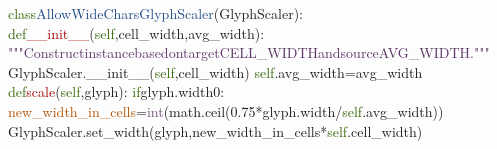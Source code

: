 \ESHBol{}\textcolor[HTML]{346604}{class}\ESHSpace{}\textcolor[HTML]{204A87}{AllowWideCharsGlyphScaler}(GlyphScaler):\ESHEol
\ESHBol{}\ESHSpace{}\ESHSpace{}\ESHSpace{}\ESHSpace{}\textcolor[HTML]{346604}{def}\ESHSpace{}\textcolor[HTML]{A40000}{\_\_init\_\_}(\textcolor[HTML]{346604}{self},\ESHSpace{}cell\_width,\ESHSpace{}avg\_width):\ESHEol
\ESHBol{}\ESHSpace{}\ESHSpace{}\ESHSpace{}\ESHSpace{}\ESHSpace{}\ESHSpace{}\ESHSpace{}\ESHSpace{}\textcolor[HTML]{5C3566}{"""Construct\ESHSpace{}instance\ESHSpace{}based\ESHSpace{}on\ESHSpace{}target\ESHSpace{}CELL\_WIDTH\ESHSpace{}and\ESHSpace{}source\ESHSpace{}AVG\_WIDTH."""}\ESHEol
\ESHBol{}\ESHSpace{}\ESHSpace{}\ESHSpace{}\ESHSpace{}\ESHSpace{}\ESHSpace{}\ESHSpace{}\ESHSpace{}GlyphScaler.\_\_init\_\_(\textcolor[HTML]{346604}{self},\ESHSpace{}cell\_width)\ESHEol
\ESHBol{}\ESHSpace{}\ESHSpace{}\ESHSpace{}\ESHSpace{}\ESHSpace{}\ESHSpace{}\ESHSpace{}\ESHSpace{}\textcolor[HTML]{346604}{self}.avg\_width\ESHSpace{}=\ESHSpace{}avg\_width\ESHEol
\ESHBol{}\mbox{}\ESHEol
\ESHBol{}\ESHSpace{}\ESHSpace{}\ESHSpace{}\ESHSpace{}\textcolor[HTML]{346604}{def}\ESHSpace{}\textcolor[HTML]{A40000}{scale}(\textcolor[HTML]{346604}{self},\ESHSpace{}glyph):\ESHEol
\ESHBol{}\ESHSpace{}\ESHSpace{}\ESHSpace{}\ESHSpace{}\ESHSpace{}\ESHSpace{}\ESHSpace{}\ESHSpace{}\textcolor[HTML]{346604}{if}\ESHSpace{}glyph.width\ESHSpace{}{>}\ESHSpace{}0:\ESHEol
\ESHBol{}\ESHSpace{}\ESHSpace{}\ESHSpace{}\ESHSpace{}\ESHSpace{}\ESHSpace{}\ESHSpace{}\ESHSpace{}\ESHSpace{}\ESHSpace{}\ESHSpace{}\ESHSpace{}\textcolor[HTML]{B35000}{new\_width\_in\_cells}\ESHSpace{}=\ESHSpace{}\textcolor[HTML]{75507B}{int}(math.ceil(0.75\ESHSpace{}*\ESHSpace{}glyph.width\ESHSpace{}/\ESHSpace{}\textcolor[HTML]{346604}{self}.avg\_width))\ESHEol
\ESHBol{}\ESHSpace{}\ESHSpace{}\ESHSpace{}\ESHSpace{}\ESHSpace{}\ESHSpace{}\ESHSpace{}\ESHSpace{}\ESHSpace{}\ESHSpace{}\ESHSpace{}\ESHSpace{}\ESHEol
\ESHBol{}\ESHSpace{}\ESHSpace{}\ESHSpace{}\ESHSpace{}\ESHSpace{}\ESHSpace{}\ESHSpace{}\ESHSpace{}\ESHSpace{}\ESHSpace{}\ESHSpace{}\ESHSpace{}\ESHEol
\ESHBol{}\ESHSpace{}\ESHSpace{}\ESHSpace{}\ESHSpace{}\ESHSpace{}\ESHSpace{}\ESHSpace{}\ESHSpace{}\ESHSpace{}\ESHSpace{}\ESHSpace{}\ESHSpace{}GlyphScaler.set\_width(glyph,\ESHSpace{}new\_width\_in\_cells\ESHSpace{}*\ESHSpace{}\textcolor[HTML]{346604}{self}.cell\_width)